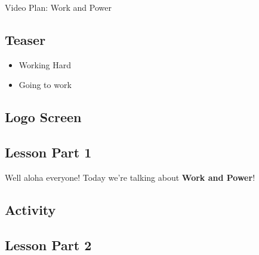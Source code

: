 \documentclass[letterpaper, 12pt]{article}
\begin{document}
	


\begin{center}Video Plan: Work and Power
\end{center}
\subsection*{Teaser}
\begin{itemize}
	\item Working Hard
	\item Going to work
\end{itemize}


\subsection*{Logo Screen}
\subsection*{Lesson Part 1}
Well aloha everyone!  Today we're talking about \textbf{Work and Power}!

\subsection*{Activity}
\subsection*{Lesson Part 2}



 
\end{document}
